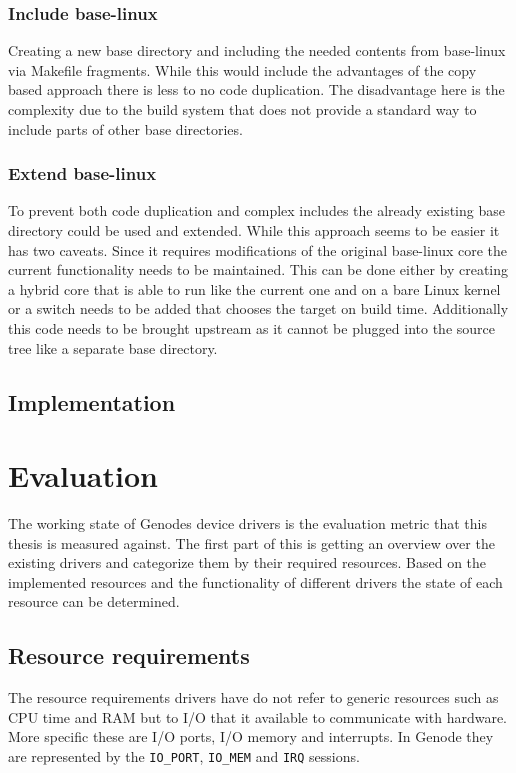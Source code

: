\documentclass[
a4paper,
12pt,
notitlepage,
parskip=half,
DIV=11,
]{scrbook}
\begin{document}
		\subsection{Include base-linux}
		Creating a new base directory and including the needed contents from base-linux via Makefile fragments.
		While this would include the advantages of the copy based approach there is less to no code duplication.
		The disadvantage here is the complexity due to the build system that does not provide a standard way to include parts of other base directories.
		
		\subsection{Extend base-linux}
		To prevent both code duplication and complex includes the already existing base directory could be used and extended.
		While this approach seems to be easier it has two caveats.
		Since it requires modifications of the original base-linux core the current functionality needs to be maintained.
		This can be done either by creating a hybrid core that is able to run like the current one and on a bare Linux kernel or a switch needs to be added that chooses the target on build time.
		Additionally this code needs to be brought upstream as it cannot be plugged into the source tree like a separate base directory.
	
		\section{Implementation}
		
		
	
	\chapter{Evaluation}
	
		The working state of Genodes device drivers is the evaluation metric that this thesis is measured against.
		The first part of this is getting an overview over the existing drivers and categorize them by their required resources.
		Based on the implemented resources and the functionality of different drivers the state of each resource can be determined.
		
		\section{Resource requirements}
		
		The resource requirements drivers have do not refer to generic resources such as CPU time and RAM but to I/O that it available to communicate with hardware.
		More specific these are I/O ports, I/O memory and interrupts.
		In Genode they are represented by the \texttt{IO\_PORT}, \texttt{IO\_MEM} and \texttt{IRQ} sessions.
		
\end{document}
